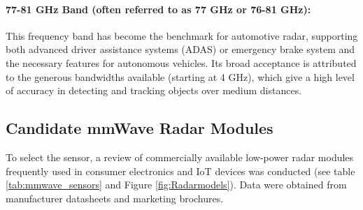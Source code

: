 \paragraph{77-81 GHz Band (often referred to as 77 GHz or 76-81 GHz):} This frequency band has become the benchmark for automotive radar, supporting both advanced driver assistance systems (ADAS) or emergency brake system and the necessary features for autonomous vehicles. Its broad acceptance is attributed to the generous bandwidths available (starting at 4 GHz), which give a high level of accuracy in detecting and tracking objects over medium distances. 




\subsection{Candidate mmWave Radar Modules}
To select the sensor, a review of commercially available low-power radar modules frequently used in consumer electronics and IoT devices was conducted (see table \ref{tab:mmwave_sensors} and Figure \ref{fig:Radarmodels}). Data were obtained from manufacturer datasheets and marketing brochures.
